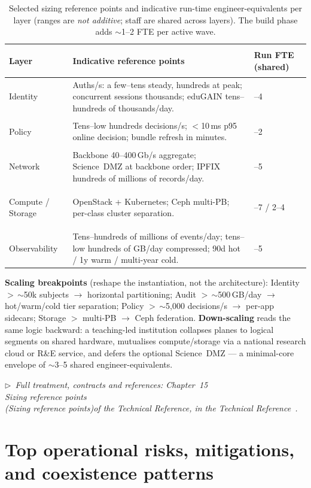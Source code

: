 \documentclass[11pt,a4paper]{article}
\newcommand{\trchap}[2]{%
  Chapter~#1%
  \ifx\\#2\\\else\space(\emph{#2})\fi\space of the Technical Reference}
\newcommand{\mainref}[1]{%
  \par\vspace{1pt}
  {\footnotesize\color{gray}\itshape
  $\triangleright$~Full treatment, contracts and references: #1,
  in the Technical Reference~\cite{ng-tech-ref-2026}.}\par\vspace{2pt}}
\begin{document}
\begin{table}[h!]
\centering\small
\begin{tabularx}{\textwidth}{
  >{\bfseries\raggedright\arraybackslash}p{3.0cm}
  >{\raggedright\arraybackslash}X
  >{\raggedright\arraybackslash}p{2.6cm}}
\toprule
\textbf{Layer} & \textbf{Indicative reference points} & \textbf{Run FTE
(shared)} \\
\midrule
Identity &
  Auths/s: a few--tens steady, hundreds at peak; concurrent sessions
  thousands; eduGAIN tens--hundreds of thousands/day. & 2--4 \\
\addlinespace
Policy &
  Tens--low hundreds decisions/s; $<$10\,ms p95 online decision; bundle
  refresh in minutes. & 1--2 \\
\addlinespace
Network &
  Backbone 40--400\,Gb/s aggregate; Science~DMZ at backbone order;
  IPFIX hundreds of millions of records/day. & 3--5 \\
\addlinespace
Compute / Storage &
  OpenStack + Kubernetes; Ceph multi-PB; per-class cluster separation. &
  4--7 / 2--4 \\
\addlinespace
Observability &
  Tens--hundreds of millions of events/day; tens--low hundreds of GB/day
  compressed; 90d hot / 1y warm / multi-year cold. & 3--5 \\
\bottomrule
\end{tabularx}
\caption{Selected sizing reference points and indicative run-time
engineer-equivalents per layer (ranges are \emph{not additive}; staff are
shared across layers). The build phase adds $\sim$1--2 FTE per active wave.}
\end{table}

\noindent\textbf{Scaling breakpoints} (reshape the instantiation, not the
architecture): Identity $>$\,$\sim$50k subjects $\to$ horizontal
partitioning; Audit $>$\,$\sim$500\,GB/day $\to$ hot/warm/cold tier
separation; Policy $>$\,$\sim$5{,}000 decisions/s $\to$ per-app sidecars;
Storage $>$ multi-PB $\to$ Ceph federation. \textbf{Down-scaling} reads the
same logic backward: a teaching-led institution collapses planes to logical
segments on shared hardware, mutualises compute/storage via a national
research cloud or R\&E service, and defers the optional Science~DMZ ---
a minimal-core envelope of $\sim$3--5 shared engineer-equivalents.

\mainref{\trchap{15}{Sizing reference points}}

\section{Top operational risks, mitigations, and coexistence patterns}
\end{document}

